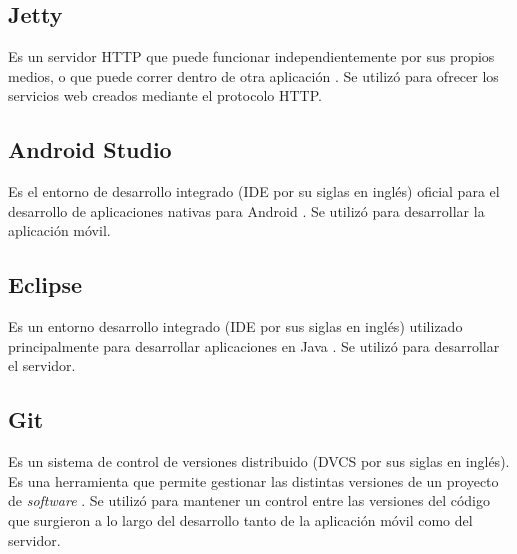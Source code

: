 \subsection{Jetty}
Es un servidor HTTP que puede funcionar independientemente por sus propios medios, o que puede correr dentro de otra aplicación \cite{JTY1}. Se utilizó para ofrecer los servicios web creados mediante el protocolo HTTP.

\subsection{Android Studio}
Es el entorno de desarrollo integrado (IDE por su siglas en inglés) oficial para el desarrollo de aplicaciones nativas para Android \cite{ASD1}. Se utilizó para desarrollar la aplicación móvil.

\subsection{Eclipse}
Es un entorno desarrollo integrado (IDE por sus siglas en inglés) utilizado principalmente para desarrollar aplicaciones en Java \cite{ECL1}. Se utilizó para desarrollar el servidor.

\subsection{Git}
Es un sistema de control de versiones distribuido (DVCS por sus siglas en inglés). Es una herramienta que permite gestionar las distintas versiones de un proyecto de \textit{software} \cite{GIT1}. Se utilizó para mantener un control entre las versiones del código que surgieron a lo largo del desarrollo tanto de la aplicación móvil como del servidor.
